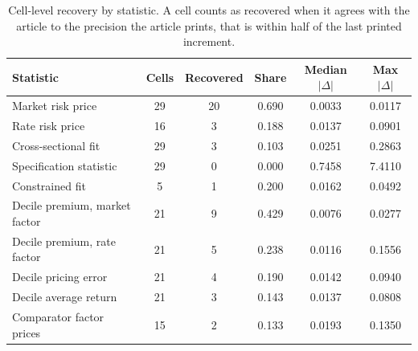 \begin{table}[htbp]
\centering
\caption{Cell-level recovery by statistic. A cell counts as recovered when it
agrees with the article to the precision the article prints, that is within half
of the last printed increment.}
\label{tab:recovery}
\begin{tabular}{lccccc}
\toprule
Statistic & Cells & Recovered & Share & Median $|\Delta|$ & Max $|\Delta|$ \\
\midrule
Market risk price & 29 & 20 & 0.690 & 0.0033 & 0.0117 \\ %
Rate risk price & 16 & 3 & 0.188 & 0.0137 & 0.0901 \\ %
Cross-sectional fit & 29 & 3 & 0.103 & 0.0251 & 0.2863 \\ %
Specification statistic & 29 & 0 & 0.000 & 0.7458 & 7.4110 \\ %
Constrained fit & 5 & 1 & 0.200 & 0.0162 & 0.0492 \\ %
Decile premium, market factor & 21 & 9 & 0.429 & 0.0076 & 0.0277 \\ %
Decile premium, rate factor & 21 & 5 & 0.238 & 0.0116 & 0.1556 \\ %
Decile pricing error & 21 & 4 & 0.190 & 0.0142 & 0.0940 \\ %
Decile average return & 21 & 3 & 0.143 & 0.0137 & 0.0808 \\ %
Comparator factor prices & 15 & 2 & 0.133 & 0.0193 & 0.1350 \\ %
\bottomrule
\end{tabular}
\end{table}
